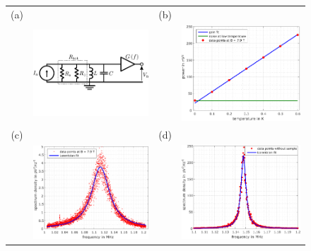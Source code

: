 \begin{figure}[hptb]
	\begin{center}
		\begin{tabular}{c c c c}
			(a) & & (b) & \\
			& \includegraphics[width = 6.5 cm]{./chap2/gain_low_freq_noise} &
			& \includegraphics[width = 6.5 cm]{./chap2/temperature_calibration} \\
			(c) & & (d) & \\
			& \includegraphics[width = 6.5 cm]{./chap2/noise_spectrum_nu_1} &
			& \includegraphics[width = 6.5 cm]{./chap2/noise_spectrum_open}
			

\end{tabular}
\end{center}
\end{figure}
